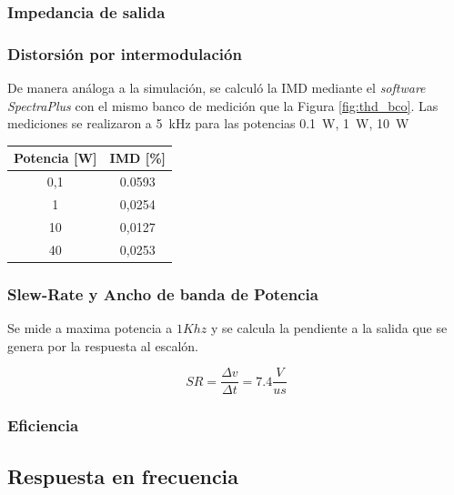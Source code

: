 		\subsubsection{Impedancia de salida}
%
%
		\subsubsection{Distorsión por intermodulación}

		De manera análoga a la simulación, se calculó la IMD mediante el \textit{software SpectraPlus} con el mismo banco de medición que la Figura \ref{fig:thd_bco}. Las mediciones se realizaron a \SI{5}{\kilo\hertz} para las potencias \SI{0.1}{\watt}, \SI{1}{\watt}, \SI{10}{\watt}

			\begin{table}[H]
				\centering
				\begin{tabular}{cc}
				\toprule
				Potencia [W] & IMD [\%]\\
				\midrule
				0,1 & 0.0593 \\
				1 & 0,0254 \\
				10 & 0,0127 \\
				40 & 0,0253 \\
				\bottomrule
				\end{tabular}
			\end{table}



		\subsubsection{Slew-Rate y Ancho de banda de Potencia}
		Se mide a maxima potencia a $1Khz$ y se calcula la pendiente a la salida que se genera por la respuesta al escalón.

		\begin{equation*}
			SR  = \frac{\varDelta v}{\varDelta t} = 7.4 \frac{V}{us}
		\end{equation*}

		\subsubsection{Eficiencia}

		\subsection{Respuesta en frecuencia}

